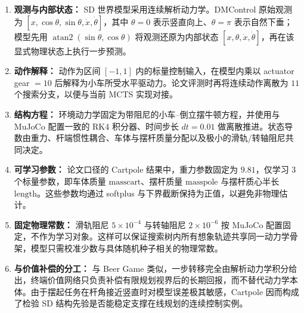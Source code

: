 \documentclass[UTF8]{ctexart}
\begin{document}
{\color{red}
\begin{enumerate}
\item \textbf{观测与内部状态：} SD 世界模型采用连续解析动力学。DMControl 原始观测为 \([x,\cos\theta,\sin\theta,\dot x,\dot\theta]\)，其中 \(\theta=0\) 表示竖直向上、\(\theta=\pi\) 表示自然下垂；模型先用 \(\operatorname{atan2}(\sin\theta,\cos\theta)\) 将观测还原为内部状态 \([x,\theta,\dot x,\dot\theta]\)，再在该显式物理状态上执行一步预测。
\item \textbf{动作解释：} 动作为区间 \([-1,1]\) 内的标量控制输入，在模型内乘以 actuator gear \(=10\) 后解释为小车所受水平驱动力。论文评测时再将连续动作离散为 \(11\) 个搜索分支，以便与当前 MCTS 实现对接。
\item \textbf{结构方程：} 环境动力学固定为带阻尼的小车--倒立摆牛顿方程，并使用与 MuJoCo 配置一致的 RK4 积分器、时间步长 \(dt=0.01\) 做离散推进。状态导数由重力、杆端惯性耦合、车体与摆杆质量分配以及极小的滑轨/转轴阻尼共同决定。
\item \textbf{可学习参数：} 论文口径的 Cartpole 结果中，重力参数固定为 \(9.81\)，仅学习 \(3\) 个标量参数，即车体质量 \(\text{masscart}\)、摆杆质量 \(\text{masspole}\) 与摆杆质心半长 \(\text{length}\)。这些参数均通过 softplus 与下界截断保持为正值，以避免非物理估计。
\item \textbf{固定物理常数：} 滑轨阻尼 \(5\times10^{-4}\) 与转轴阻尼 \(2\times10^{-6}\) 按 MuJoCo 配置固定，不作为学习对象。这样可以保证搜索树内所有想象轨迹共享同一动力学骨架，模型只需校准少数与具体随机种子相关的物理常数。
\item \textbf{与价值补偿的分工：} 与 Beer Game 类似，一步转移完全由解析动力学积分给出，终端价值网络只负责补偿有限规划视界后的长期回报，而不替代动力学本体。由于摆起任务在杆角接近竖直时对模型误差极其敏感，Cartpole 因而构成了检验 SD 结构先验是否能稳定支撑在线规划的连续控制实例。
\end{enumerate}
}
\end{document}
